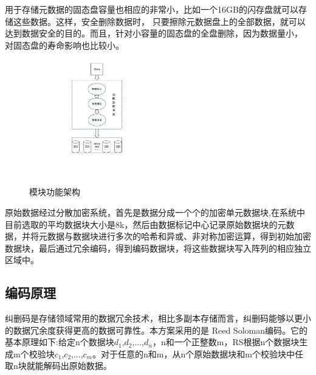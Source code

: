 用于存储元数据的固态盘容量也相应的非常小，比如一个16GB的闪存盘就可以存储这些数据。这样，安全删除数据时，
只要擦除元数据盘上的全部数据，就可以达到数据安全的目的。而且，针对小容量的固态盘的全盘删除，因为数据量小，
对固态盘的寿命影响也比较小。
\begin{figure}[H]
	\centering
	\includegraphics[width=3in]{Pics/total-structure.pdf}
    \caption{模块功能架构}
    \label{fig:4}
\end{figure}
原始数据经过分散加密系统，首先是数据分成一个个的加密单元数据块,在系统中目前选取的平均数据块大小是8k，然后由数据标记中心记录原始数据块的元数据，并将元数据与数据块进行多次的哈希和异或、非对称加密运算，得到初始加密数据块，最后通过冗余编码，得到编码数据块，将这些数据块写入阵列的相应独立区域中。
\subsection{编码原理}
纠删码是存储领域常用的数据冗余技术，相比多副本存储而言，纠删码能够以更小的数据冗余度获得更高的数据可靠性。本方案采用的是
Reed Soloman编码\cite{Plank1996A,Plank2013Erasure}。它的基本原理如下:给定n个数据块$d_1$,$d_2$,...,$d_n$，n和一个正整数m，RS根据n个数据块生成m个校验块$c_1$,$c_2$,...,$c_m$。对于任意的n和m，从n个原始数据块和m个校验块中任取n块就能解码出原始数据。


